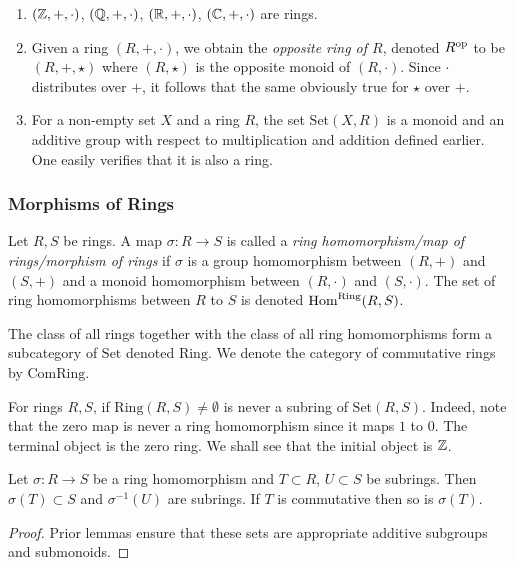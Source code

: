 \begin{example}
    \begin{enumerate}
        \item $(\mathbb{Z},+,\cdot)$, $(\mathbb{Q},+,\cdot)$, $(\mathbb{R},+,\cdot)$, $(\mathbb{C},+,\cdot)$ are rings.
        \item Given a ring $(R,+,\cdot)$, we obtain the \emph{opposite ring of $R$}, denoted $R^\mathrm{op}$ to be $(R,+,\star)$ where $(R,\star)$ is the opposite monoid of $(R,\cdot)$. Since $\cdot$ distributes over $+$, it follows that the same obviously true for $\star$ over $+$.  
        \item For a non-empty set $X$ and a ring $R$, the set $\mathrm{Set}(X,R)$ is a monoid and an additive group with respect to multiplication and addition defined earlier. One easily verifies that it is also a ring.  
    \end{enumerate}
\end{example}
\subsubsection{Morphisms of Rings}
\begin{definition}
    Let $R,S$ be rings. A map $\sigma : R \rightarrow S$ is called a \textit{ring homomorphism/map of rings/morphism of rings} if $\sigma$ is a group homomorphism between $(R,+)$ and $(S,+)$ and a monoid homomorphism between $(R,\cdot)$ and $(S,\cdot)$. The set of ring homomorphisms between $R$ to $S$ is denoted $\mathrm{Hom}^\text{Ring}(R,S)$.
\end{definition}
\begin{remark}
    The class of all rings together with the class of all ring homomorphisms form a subcategory of $\mathrm{Set}$ denoted $\mathrm{Ring}$. We denote the category of commutative rings by $\mathrm{ComRing}$.
\end{remark}
\begin{example}
     For rings $R,S$, if $\mathrm{Ring}(R,S)\neq \emptyset$ is never a subring of $\mathrm{Set}(R,S)$. Indeed, note that the zero map is never a ring homomorphism since it maps $1$ to $0$. The terminal object is the zero ring. We shall see that the initial object is $\mathbb{Z}$.
\end{example} 
\begin{lemma}
    Let $\sigma : R\rightarrow S$ be a ring homomorphism and $T\subset R$, $U\subset S$ be subrings. Then $\sigma(T)\subset S$ and $\sigma^{-1}(U)$ are subrings. If $T$ is commutative then so is $\sigma(T)$.
\end{lemma}
\begin{proof}
    Prior lemmas ensure that these sets are appropriate additive subgroups and submonoids.
\end{proof}
